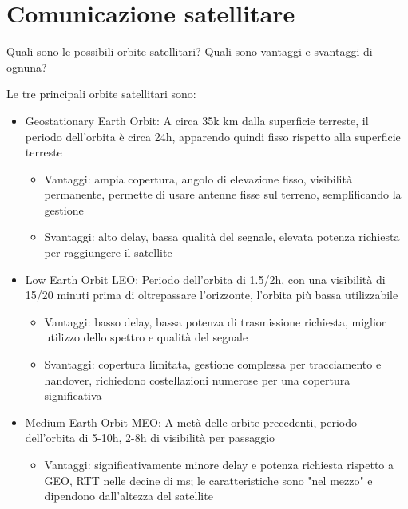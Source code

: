 \section{Comunicazione satellitare}

\begin{questions}
    \question Quali sono le possibili orbite satellitari? Quali sono vantaggi e svantaggi di ognuna?
    
    \begin{solution}
        Le tre principali orbite satellitari sono:
        \begin{itemize}
            \item Geostationary Earth Orbit: A circa 35k km dalla superficie terreste, il periodo dell'orbita è circa 24h, apparendo quindi fisso rispetto alla superficie terreste
            \begin{itemize}
                \item Vantaggi: ampia copertura, angolo di elevazione fisso, visibilità permanente, permette di usare antenne fisse sul terreno, semplificando la gestione
                
                \item Svantaggi: alto delay, bassa qualità del segnale, elevata potenza richiesta per raggiungere il satellite
            \end{itemize}
            
            \item Low Earth Orbit LEO: Periodo dell'orbita di 1.5/2h, con una visibilità di 15/20 minuti prima di oltrepassare l'orizzonte, l'orbita più bassa utilizzabile
            \begin{itemize}
                \item Vantaggi: basso delay, bassa potenza di trasmissione richiesta, miglior utilizzo dello spettro e qualità del segnale
                
                \item Svantaggi: copertura limitata, gestione complessa per tracciamento e handover, richiedono costellazioni numerose per una copertura significativa
            \end{itemize}
            
            \item Medium Earth Orbit MEO: A metà delle orbite precedenti, periodo dell'orbita di 5-10h, 2-8h di visibilità per passaggio
            \begin{itemize}
                \item Vantaggi: significativamente minore delay e potenza richiesta rispetto a GEO, RTT nelle decine di ms; le caratteristiche sono "nel mezzo" e dipendono dall'altezza del satellite
                

\end{itemize}
\end{itemize}
\end{solution}
\end{questions}
